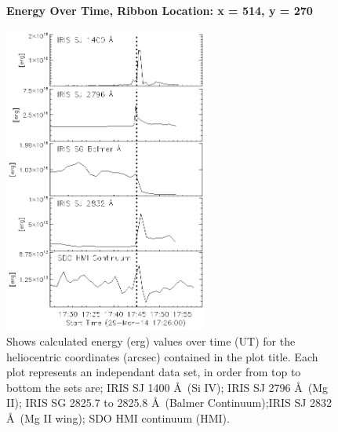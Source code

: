 \begin{figure}[H]
  \begin{center}
  \textbf{Energy Over Time, Ribbon Location: x = 514, y = 270 }\par\medskip
  \includegraphics[width=0.6\textwidth]{29-Mar-14-Ribbon-xyPosition-514-270-Frame-1-Energy-Ladder}
  \end{center}
  \caption{Shows calculated energy (erg) values over time (UT) for the heliocentric coordinates (arcsec) contained in the plot title. Each plot represents an independant data set, in order from top to bottom the sets are; IRIS SJ 1400 \AA\ (Si IV); IRIS SJ 2796 \AA\ (Mg II); IRIS SG  2825.7 to 2825.8 \AA\ (Balmer Continuum);IRIS SJ 2832 \AA\ (Mg II wing); SDO HMI continuum (HMI).}\label{erb10}
\end{figure}

